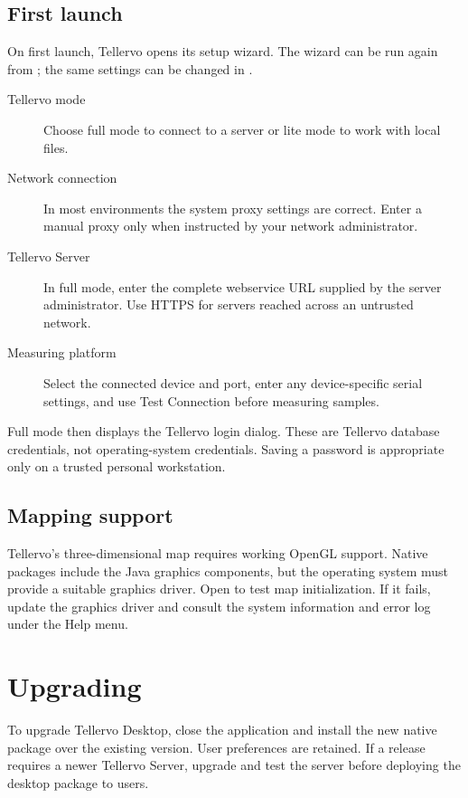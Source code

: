 \subsection{First launch}

On first launch, Tellervo opens its setup wizard. The wizard can be run again
from ; the same settings can be changed in
.

\begin{description}
 \item[Tellervo mode] Choose full mode to connect to a server or lite mode to
 work with local files.
 \item[Network connection] In most environments the system proxy settings are
 correct. Enter a manual proxy only when instructed by your network
 administrator.
 \item[Tellervo Server] In full mode, enter the complete webservice URL supplied
 by the server administrator. Use HTTPS for servers reached across an
 untrusted network.
 \item[Measuring platform] Select the connected device and port, enter any
 device-specific serial settings, and use Test Connection before measuring
 samples.
\end{description}

Full mode then displays the Tellervo login dialog. These are Tellervo database
credentials, not operating-system credentials. Saving a password is appropriate
only on a trusted personal workstation.

\subsection{Mapping support}

Tellervo's three-dimensional map requires working OpenGL support. Native
packages include the Java graphics components, but the operating system must
provide a suitable graphics driver. Open  to test map
initialization. If it fails, update the graphics driver and consult the system
information and error log under the Help menu.

\section{Upgrading}

To upgrade Tellervo Desktop, close the application and install the new native
package over the existing version. User preferences are retained. If a release
requires a newer Tellervo Server, upgrade and test the server before deploying
the desktop package to users.

